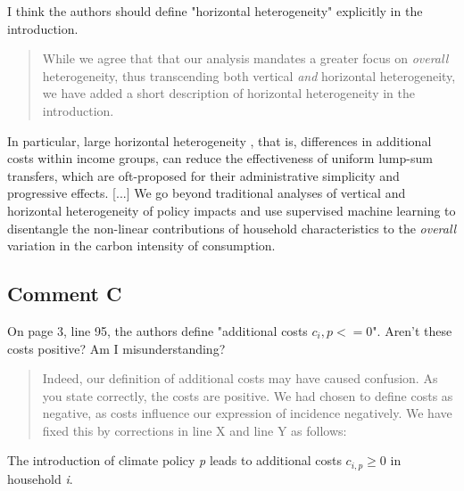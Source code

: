 \documentclass[11pt]{article}
\newenvironment{response}
{\begin{quote}\color{black}}
{\end{quote}}
\begin{document}
\begin{commentbox}
    I think the authors should define "horizontal heterogeneity" explicitly in the introduction.
\end{commentbox}

\begin{response}
    While we agree that that our analysis mandates a greater focus on \textit{overall} heterogeneity, thus transcending both vertical \textit{and} horizontal heterogeneity, we have added a short description of horizontal heterogeneity in the introduction.
    
\end{response}

\begin{revisionbox}
    In particular, large horizontal heterogeneity \autocite{Fischer.2019,Hansel.2022}, that is, differences in additional costs within income groups, can reduce the effectiveness of uniform lump-sum transfers, which are oft-proposed for their administrative simplicity and progressive effects. [...] We go beyond traditional analyses of vertical and horizontal heterogeneity of policy impacts and use supervised machine learning to disentangle the non-linear contributions of household characteristics to the \textit{overall} variation in the carbon intensity of consumption.
\end{revisionbox}

\subsection*{Comment C}\label{comment_R1_C}

\begin{commentbox}
    On page 3, line 95, the authors define "additional costs $c_i,p <= 0$". Aren't these costs positive? Am I misunderstanding?
\end{commentbox}

\begin{response}

Indeed, our definition of additional costs may have caused confusion. As you state correctly, the costs are positive. We had chosen to define costs as negative, as costs influence our expression of incidence negatively. We have fixed this by corrections in line X and line Y as follows:
\end{response}
\begin{revisionbox}
    The introduction of climate policy \textit{p} leads to additional costs $c_{i,p}\geq 0$ in household \textit{i}.
\end{revisionbox}
\end{document}
